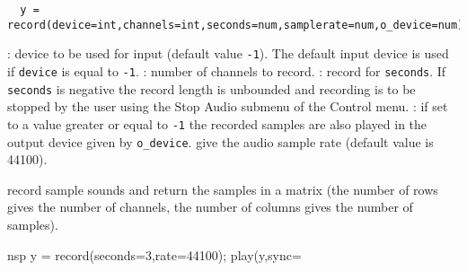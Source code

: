 \begin{mandesc}
\end{mandesc}
\begin{calling_sequence}
\begin{verbatim}
  y = record(device=int,channels=int,seconds=num,samplerate=num,o_device=num)
\end{verbatim}
\end{calling_sequence}
\begin{parameters}
  \begin{varlist}
   : device to be used for input (default value \verb+-1+). The default
   input device is used if \verb+device+ is equal to \verb+-1+.
   : number of channels to record.
   : record for \verb+seconds+. If \verb+seconds+ is negative the 
   record length is unbounded and recording is to be stopped by the user using the 
   Stop Audio submenu of the Control menu. 
   : if set to a value greater or equal to \verb+-1+ the recorded 
   samples are also played in the output device given by \verb+o_device+.
    give the audio sample rate (default value is 44100).
  \end{varlist}
\end{parameters}

\begin{mandescription}
  record sample sounds and return the samples in a matrix (the number of 
  rows gives the number of channels, the number of columns gives the number of samples).
\end{mandescription}
\begin{examples}
  \begin{mintednsp}{nsp}
    y = record(seconds=3,rate=44100);
    play(y,sync=%
  \end{mintednsp}
\end{examples}
\begin{manseealso}
\end{manseealso}


